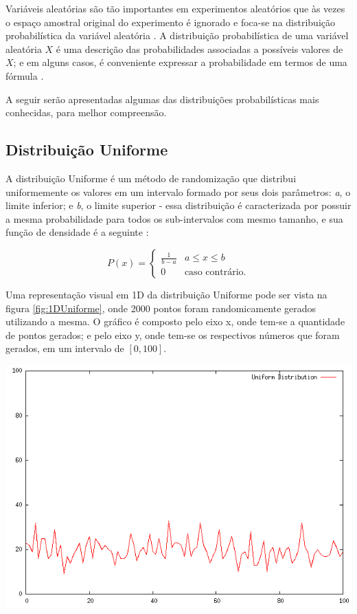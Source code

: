 Variáveis aleatórias são tão importantes em experimentos aleatórios que às vezes o espaço amostral original do experimento é ignorado e foca-se na distribuição probabilística da variável aleatória \cite{montgomery}. A distribuição probabilística de uma variável aleatória $X$ é uma descrição das probabilidades
associadas a possíveis valores de $X$; e em alguns casos, é conveniente expressar a probabilidade em termos de uma fórmula \cite{montgomery}.

A seguir serão apresentadas algumas das distribuições probabilísticas mais conhecidas, para melhor compreensão.

\subsection{Distribuição Uniforme}
A distribuição Uniforme é um método de randomização que distribui uniformemente os valores em um intervalo formado por seus dois parâmetros: \textit{a}, o limite inferior; e \textit{b}, o limite superior - essa distribuição é caracterizada por possuir a mesma probabilidade para todos os sub-intervalos com mesmo tamanho, e sua função de densidade é a seguinte \cite{fister}:

\begin{equation}
P(x) = 
\begin{cases}
	\frac{1}{b - a}    & \text{$a \leq x \leq b$}\\
    0 & \text{caso contrário.}
\end{cases}
\end{equation}

Uma representação visual em 1D da distribuição Uniforme pode ser vista na figura \ref{fig:1DUniforme}, onde 2000 pontos foram randomicamente gerados utilizando a mesma. O gráfico é composto pelo eixo x, onde tem-se a quantidade de pontos gerados; e pelo eixo y, onde tem-se os respectivos números que foram gerados, em um intervalo de $[0, 100]$.

{
    \centering
    \includegraphics[width=0.5\linewidth]{figuras/DistribuicaoUniforme.png}
    \label{fig:1DUniforme}
}

